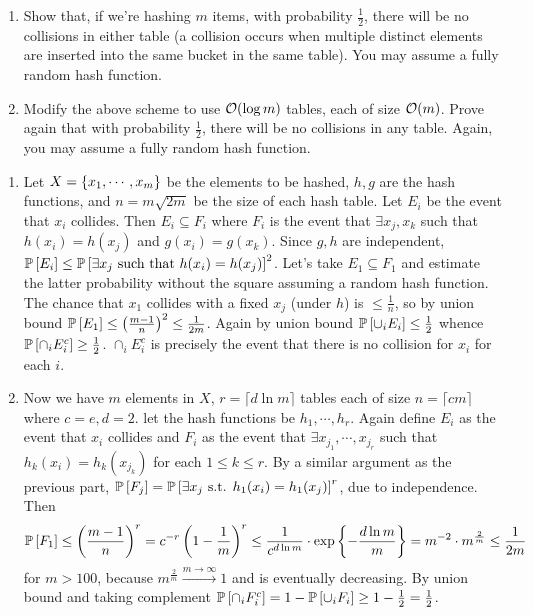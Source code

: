\begin{enumerate}[leftmargin=*, label=(\alph*)]
\item Show that, if we’re hashing $m$ items, with probability $\frac12$, there will be no collisions in either table (a collision occurs when multiple distinct elements are inserted into the same bucket in the same table). You may assume a fully random hash function.
\item Modify the above scheme to use $\cO(\log m)$ tables, each of size $\cO(m)$. Prove again that with probability $\frac12$, there will be no collisions in any table. Again, you may assume a fully random hash function.
\end{enumerate}


\soln

\begin{enumerate}[leftmargin=*, label=(\alph*)]
\item Let $X=\set{x_{1},\cdots,x_{m}}$ be the elements to be hashed, $h,g$ are the hash functions, and $n=m\sqrt{2m}$ be the size of each hash table. Let $E_{i}$ be the event that $x_{i}$ collides. Then $E_{i} \subseteq F_{i}$ where $F_{i}$ is the event that $\exists x_{j},x_{k}$ such that $h(x_{i})=h(x_{j})$ and $g(x_{i}) = g(x_{k})$. Since $g,h$ are independent, $\P{E_{i}}\le \P{\exists x_{j} \text{ such that } h(x_{i})=h(x_{j})}^{2}$. Let's take $E_{1}\subseteq F_{1}$ and estimate the latter probability without the square assuming a random hash function. The chance that $x_{1}$ collides with a fixed $x_{j}$ (under $h$) is $\le \frac{1}{n}$, so by union bound $\P{E_{1}}\le \left(\frac{m-1}{n}\right)^{2} \le \frac{1}{2m}$. Again by union bound $\P{\cup_{i}E_{i}} \le \frac12$ whence $\P{\cap_{i}E_{i}^{c}}\ge \frac12$. $\cap_{i}E_{i}^{c}$ is precisely the event that there is no collision for $x_{i}$ for each $i$.
\item Now we have $m$ elements in $X$, $r=\lceil d\ln m\rceil$ tables each of size $n=\lceil cm\rceil$ where $c=e,d=2$. let the hash functions be $h_{1},\cdots,h_{r}$. Again define $E_{i}$ as the event that $x_{i}$ collides and $F_{i}$ as the event that $\exists x_{j_{1}},\cdots,x_{j_{r}}$ such that $h_{k}(x_{i})=h_{k}(x_{j_{k}})$ for each $1\le k\le r$. By a similar argument as the previous part, $\P{F_{j}} = \P{\exists x_{j} \text{ s.t. } h_{1}(x_{i}) = h_{1}(x_{j})}^{r}$, due to independence. Then $$\P{F_{1}} \le \left(\frac{m-1}{n}\right)^{r} = c^{-r}\left(1-\frac{1}{m}\right)^{r} \le \frac{1}{c^{d\ln m}}\cdot \exp\set{-\frac{d\ln m}{m}} = m^{-2}\cdot m^{\frac{2}{m}} \le \frac1{2m}$$ for $m>100$, because $m^{\frac{2}{m}} \stackrel{m\to\infty}{\longrightarrow} 1$ and is eventually decreasing. By union bound and taking complement $\P{\cap_{i} F_{i}^{c}} = 1-\P{\cup_{i} F_{i}} \ge 1-\frac{1}{2} = \frac12$.
\end{enumerate}












